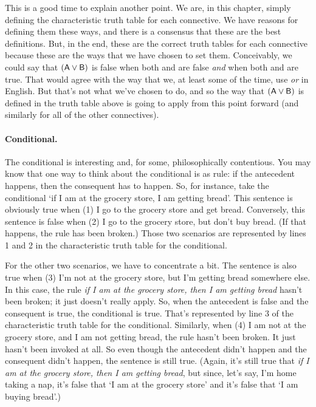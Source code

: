 This is a good time to explain another point. We are, in this chapter, simply defining the characteristic truth table for each connective. We have reasons for defining them these ways, and there is a consensus that these are the best definitions. But, in the end, these are the correct truth tables for each connective because these are the ways that we have chosen to set them. Conceivably, we could say that $(\mathsf{A}\vee \mathsf{B})$ is false when both  and  are false \textit{and} when both  and  are true. That would agree with the way that we, at least some of the time, use \textit{or} in English. But that's not what we've chosen to do, and so the way that $(\mathsf{A}\vee \mathsf{B})$ is defined in the truth table above is going to apply from this point forward (and similarly for all of the other connectives). 


\paragraph{Conditional.} The conditional is interesting and, for some, philosophically contentious. You may know that one way to think about the conditional is as rule: if the antecedent happens, then the consequent has to happen. So, for instance, take the conditional `if I am at the grocery store, I am getting bread'. This sentence is obviously true when (1) I go to the grocery store and get bread. Conversely, this sentence is false when (2) I go to the grocery store, but don't buy bread. (If that happens, the rule has been broken.) Those two scenarios are represented by lines 1 and 2 in the characteristic truth table for the conditional.

For the other two scenarios, we have to concentrate a bit. The sentence is also true when (3) I'm not at the grocery store, but I'm getting bread somewhere else. In this case, the rule \textit{if I am at the grocery store, then I am getting bread} hasn't been broken; it just doesn't really apply. So, when the antecedent is false and the consequent is true, the conditional is true. That's represented by line 3 of the characteristic truth table for the conditional. Similarly, when (4) I am not at the grocery store, and I am not getting bread, the rule hasn't been broken. It just hasn't been invoked at all. So even though the antecedent didn't happen and the consequent didn't happen, the sentence is still true. (Again, it's still true that \textit{if I am at the grocery store, then I am getting bread}, but since, let's say, I'm home taking a nap, it's false that `I am at the grocery store' and it's false that `I am buying bread'.) 

